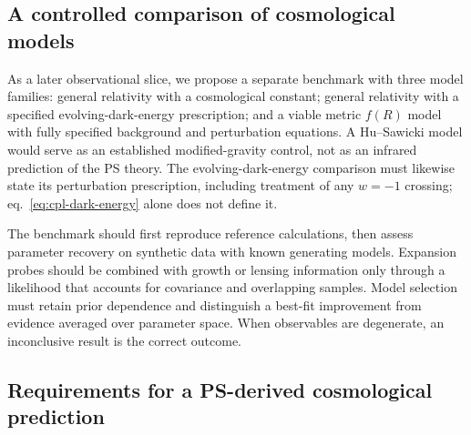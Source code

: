 \subsection{A controlled comparison of cosmological models}
\label{sec:cosmological-benchmark}

As a later observational slice, we propose a separate benchmark with three model families: general relativity with a cosmological constant; general relativity with a specified evolving-dark-energy prescription; and a viable metric $f(R)$ model with fully specified background and perturbation equations.  A Hu--Sawicki model would serve as an established modified-gravity control, not as an infrared prediction of the PS theory.  The evolving-dark-energy comparison must likewise state its perturbation prescription, including treatment of any $w=-1$ crossing; eq.~\eqref{eq:cpl-dark-energy} alone does not define it.

The benchmark should first reproduce reference calculations, then assess parameter recovery on synthetic data with known generating models.  Expansion probes should be combined with growth or lensing information only through a likelihood that accounts for covariance and overlapping samples.  Model selection must retain prior dependence and distinguish a best-fit improvement from evidence averaged over parameter space.  When observables are degenerate, an inconclusive result is the correct outcome.

\subsection{Requirements for a PS-derived cosmological prediction}
\label{sec:ps-to-observations}

